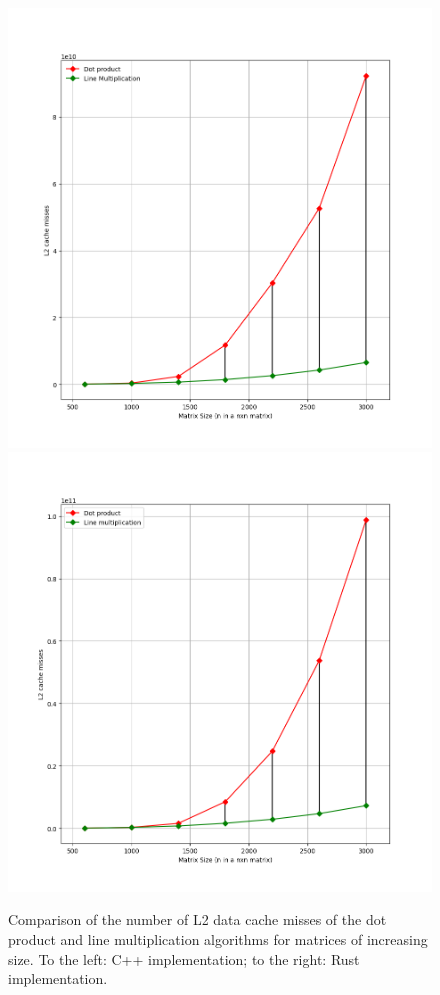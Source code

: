 \documentclass{report}
\begin{document}
				\begin{figure}[H]
					\begin{adjustbox}{center}
						\includegraphics[scale=0.4]{cpp_dot_line_l2.png}
						\includegraphics[scale=0.4]{rs_l2_misses.png}
					\end{adjustbox}
					\caption{Comparison of the number of L2 data cache misses of the dot product and line multiplication algorithms for matrices of increasing size. To the left: C++ implementation; to the right: Rust implementation.}
				\end{figure}
			
\end{document}
